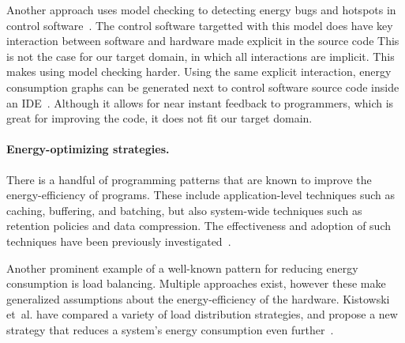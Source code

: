 Another approach uses model checking to detecting energy bugs and hotspots in control software~\cite{symbolic-energy-bugs}.
The control software targetted with this model does have key interaction between software and hardware made explicit in the source code
This is not the case for our target domain, in which all interactions are implicit.
This makes using model checking harder.
Using the same explicit interaction, energy consumption graphs can be generated next to control software source code inside an IDE~\cite{symbolic-skylines}.
Although it allows for near instant feedback to programmers, which is great for improving the code, it does not fit our target domain.

\paragraph{Energy-optimizing strategies.}

There is a handful of programming patterns that are known to improve the energy-efficiency of programs.
These include applica\-tion-level techniques such as caching, buffering, and batching, but also system-wide techniques such as retention policies and data compression.
The effectiveness and adoption of such techniques have been previously investigated~\cite{strategies-hpc,strategies-industry}.

Another prominent example of a well-known pattern for reducing energy consumption is load balancing.
Multiple approaches exist, however these make generalized assumptions about the energy-efficiency of the hardware.
Kistowski et~al. have compared a variety of load distribution strategies, and propose a new strategy that reduces a system's energy consumption even further~\cite{strategies-load-distribution}.
